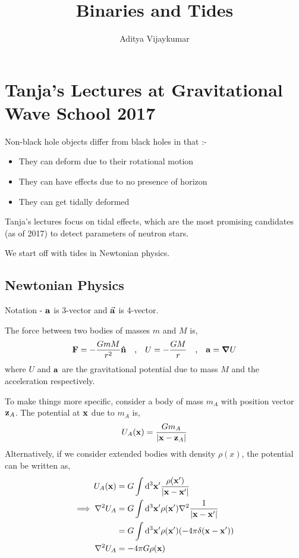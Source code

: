 \documentclass[a4paper,11pt]{article}
\title{\textbf{Binaries and Tides}}
\author{Aditya Vijaykumar}
\affiliation{International Centre for Theoretical Sciences, Bengaluru, India.}
\begin{document}
\maketitle

\section{Tanja's Lectures at Gravitational Wave School 2017}

Non-black hole objects differ from black holes in that  :-
\begin{itemize}
	\item They can deform due to their rotational motion
	\item They can have effects due to no presence of horizon
	\item They can get tidally deformed
\end{itemize}
Tanja's lectures focus on tidal effects, which are the most promising candidates (as of 2017) to detect parameters of neutron stars.

We start off with tides in Newtonian physics.

\subsection{Newtonian Physics}
Notation - $ \vb{a} $ is 3-vector and $ \va{a} $ is 4-vector.

The force between two bodies of masses $ m  $ and $ M $ is,
\begin{equation}\label{key}
\vb{F} = - \dfrac{GmM}{r^2} \vu{n} \qq{,} U = -\dfrac{GM}{r} \qq{,} \vb{a} = \grad{U}
\end{equation}
where $ U $ and $ \vb{a} $ are the gravitational potential due to mass $ M $ and the acceleration respectively.

To make things more specific, consider a body of mass $ m_A $ with position vector $ \vb{z}_A $. The potential at $\vb{x} $ due to $ m_A$ is,
\begin{equation}\label{key}
U_A(\vb{x}) = \dfrac{Gm_A}{\abs{\vb{x} - \vb{z}_A}}
\end{equation}
Alternatively, if we consider extended bodies with density $ \rho(x) $, the potential can be written as,
\begin{align}\label{key}
U_A(\vb{x}) &= G \int \dd^3{\vb{x}'}\dfrac{\rho(\vb{x}' )}{\abs{\vb{x} - \vb{x}'}}\\
\implies \laplacian{U_A} &= G \int \dd^3{\vb{x}'} \rho(\vb{x}' ) \laplacian{\dfrac{1}{\abs{\vb{x} - \vb{x}'}}} \\
&=  G \int \dd^3{\vb{x}'} \rho(\vb{x}' ) \qty(-4 \pi \delta(\vb{x} - \vb{x}'))  \\
\laplacian{U_A} &= -4 \pi G \rho(\vb{x} )
\end{align}
\end{document}
